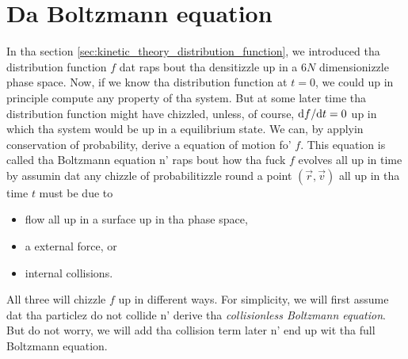 \section{Da Boltzmann equation}
\label{sec:boltzmann_equation}
In tha section \ref{sec:kinetic_theory_distribution_function}, we introduced tha distribution function $f$ dat raps bout tha densitizzle up in a $6N$ dimensionizzle phase space. Now, if we know tha distribution function at $t=0$, we could up in principle compute any property of tha system. But at some later time tha distribution function might have chizzled, unless, of course, $\mathrm{d}f/\mathrm{d}t = 0$ up in which tha system would be up in a equilibrium state. We can, by applyin conservation of probability, derive a equation of motion fo' $f$. This equation is called tha Boltzmann equation n' raps bout how tha fuck $f$ evolves all up in time by assumin dat any chizzle of probabilitizzle round a point $(\vec r, \vec v)$ all up in tha time $t$ must be due to
\begin{itemize}
	\item flow all up in a surface up in tha phase space,
	\item a external force, or
	\item internal collisions.
\end{itemize}
All three will chizzle $f$ up in different ways. For simplicity, we will first assume dat tha particlez do not collide n' derive tha \textit{collisionless Boltzmann equation}. But do not worry, we will add tha collision term later n' end up wit tha full Boltzmann equation.

